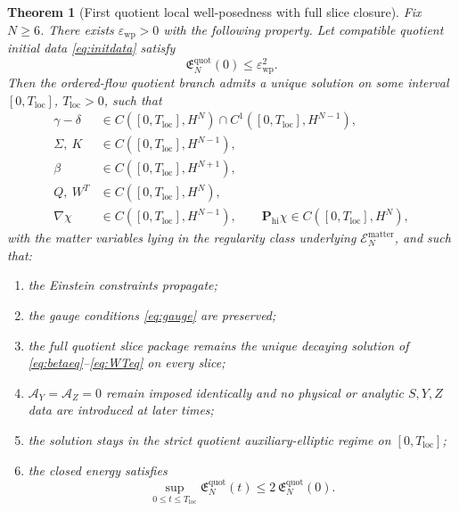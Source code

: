 \documentclass[11pt]{article}
\newcommand{\AY}{\mathcal A_Y}
\newcommand{\AZ}{\mathcal A_Z}
\newtheorem{theorem}{Theorem}
\begin{document}
\begin{theorem}[First quotient local well-posedness with full slice closure]
\label{thm:local}
Fix \(N\ge 6\). There exists \(\varepsilon_{\mathrm{wp}}>0\) with the following property. Let compatible quotient initial data \eqref{eq:initdata} satisfy
\begin{equation}
\mathfrak E_N^{\mathrm{quot}}(0)\le \varepsilon_{\mathrm{wp}}^2.
\label{eq:wpsmall}
\end{equation}
Then the ordered-flow quotient branch admits a unique solution on some interval \([0,T_{\mathrm{loc}}]\), \(T_{\mathrm{loc}}>0\), such that
\begin{align}
\gamma-\delta &\in C([0,T_{\mathrm{loc}}],H^N)\cap C^1([0,T_{\mathrm{loc}}],H^{N-1}),
\label{eq:reggamma}
\\
\Sigma,\ K &\in C([0,T_{\mathrm{loc}}],H^{N-1}),
\label{eq:regsigmak}
\\
\beta &\in C([0,T_{\mathrm{loc}}],H^{N+1}),
\label{eq:regbeta}
\\
Q,\ W^T &\in C([0,T_{\mathrm{loc}}],H^N),
\label{eq:regaux}
\\
\nabla\chi &\in C([0,T_{\mathrm{loc}}],H^{N-1}),
\qquad
\mathbf P_{\mathrm{hi}}\chi\in C([0,T_{\mathrm{loc}}],H^N),
\label{eq:regchi}
\end{align}
with the matter variables lying in the regularity class underlying \(\mathcal E_N^{\mathrm{matter}}\), and such that:
\begin{enumerate}
    \item the Einstein constraints propagate;
    \item the gauge conditions \eqref{eq:gauge} are preserved;
    \item the full quotient slice package remains the unique decaying solution of \eqref{eq:betaeq}--\eqref{eq:WTeq} on every slice;
    \item \(\AY=\AZ=0\) remain imposed identically and no physical or analytic \(S,Y,Z\) data are introduced at later times;
    \item the solution stays in the strict quotient auxiliary-elliptic regime on \([0,T_{\mathrm{loc}}]\);
    \item the closed energy satisfies
    \begin{equation}
    \sup_{0\le t\le T_{\mathrm{loc}}}\mathfrak E_N^{\mathrm{quot}}(t)
    \le
    2\,\mathfrak E_N^{\mathrm{quot}}(0).
    \label{eq:localbound}
    \end{equation}
\end{enumerate}
\end{theorem}
\end{document}
